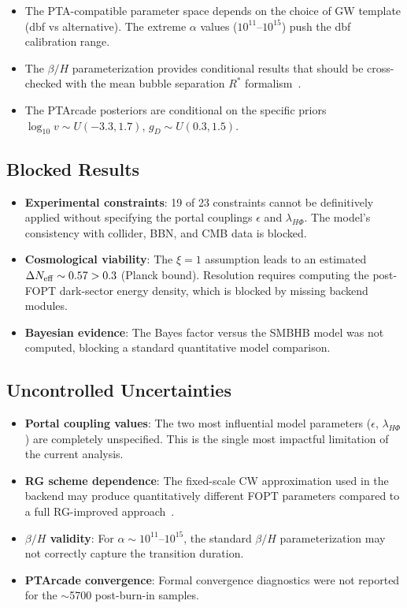 \documentclass[a4paper,11pt]{article}
\begin{document}
\begin{itemize}
\item The PTA-compatible parameter space depends on the choice of GW template (dbf vs alternative). The extreme $\alpha$ values ($10^{11}$--$10^{15}$) push the dbf calibration range.
\item The $\beta/H$ parameterization provides conditional results that should be cross-checked with the mean bubble separation $R^*$ formalism~\cite{costa2025,li2026}.
\item The PTArcade posteriors are conditional on the specific priors $\log_{10}v \sim U(-3.3,1.7)$, $g_D \sim U(0.3,1.5)$.
\end{itemize}

\subsection{Blocked Results}

\begin{itemize}
\item \textbf{Experimental constraints}: 19 of 23 constraints cannot be definitively applied without specifying the portal couplings $\epsilon$ and $\lambda_{H\Phi}$. The model's consistency with collider, BBN, and CMB data is blocked.
\item \textbf{Cosmological viability}: The $\xi=1$ assumption leads to an estimated $\Delta N_{\rm eff} \sim 0.57 > 0.3$ (Planck bound). Resolution requires computing the post-FOPT dark-sector energy density, which is blocked by missing backend modules.
\item \textbf{Bayesian evidence}: The Bayes factor versus the SMBHB model was not computed, blocking a standard quantitative model comparison.
\end{itemize}

\subsection{Uncontrolled Uncertainties}

\begin{itemize}
\item \textbf{Portal coupling values}: The two most influential model parameters ($\epsilon$, $\lambda_{H\Phi}$) are completely unspecified. This is the single most impactful limitation of the current analysis.
\item \textbf{RG scheme dependence}: The fixed-scale CW approximation used in the backend may produce quantitatively different FOPT parameters compared to a full RG-improved approach~\cite{christiansen2025}.
\item \textbf{$\beta/H$ validity}: For $\alpha \sim 10^{11}$--$10^{15}$, the standard $\beta/H$ parameterization may not correctly capture the transition duration.
\item \textbf{PTArcade convergence}: Formal convergence diagnostics were not reported for the $\sim$5700 post-burn-in samples.
\end{itemize}
\end{document}
